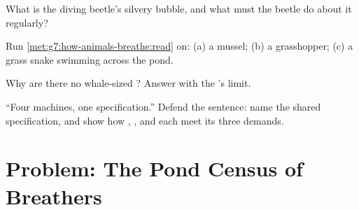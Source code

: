\begin{exercise}[$\star\star$]\label{exo:g7:how-animals-breathe:9}
What is the diving beetle's silvery bubble, and what must
the beetle do about it regularly?
\end{exercise}

\begin{exercise}[$\star\star$]\label{exo:g7:how-animals-breathe:10}
Run \cref{met:g7:how-animals-breathe:read} on: (a) a
mussel; (b) a grasshopper; (c) a grass snake swimming
across the pond.
\end{exercise}

\begin{exercise}[$\star\star$]\label{exo:g7:how-animals-breathe:11}
Why are there no whale-sized ? Answer with the
's limit.
\end{exercise}

\begin{exercise}[$\star\star\star$]\label{exo:g7:how-animals-breathe:12}
``Four machines, one specification.'' Defend the sentence:
name the shared specification, and show how , ,
 and  each meet its three demands.
\end{exercise}

\section{Problem: The Pond Census of Breathers}

